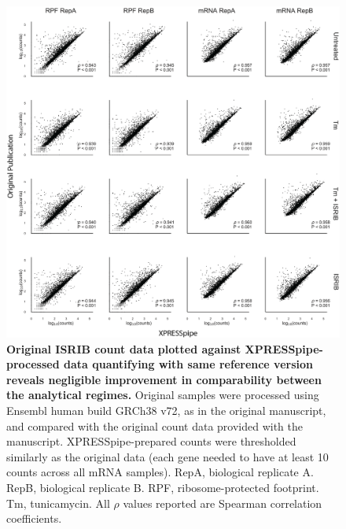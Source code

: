 \documentclass[10pt, oneside]{article}
\begin{document}
\begin{figure}
\centering
  \includegraphics[width=180mm]{figures/xpresspipe_supplement3.png}
  \caption{\textbf{Original ISRIB count data plotted against XPRESSpipe-processed data quantifying with same reference version reveals negligible improvement in comparability between the analytical regimes.} Original samples were processed using Ensembl human build GRCh38 v72, as in the original manuscript, and compared with the original count data provided with the manuscript. XPRESSpipe-prepared counts were thresholded similarly as the original data (each gene needed to have at least 10 counts across all mRNA samples). RepA, biological replicate A. RepB, biological replicate B. RPF, ribosome-protected footprint. Tm, tunicamycin. All $\rho$ values reported are Spearman correlation coefficients.}
  \label{fig:supplement3}
\end{figure}
\end{document}
